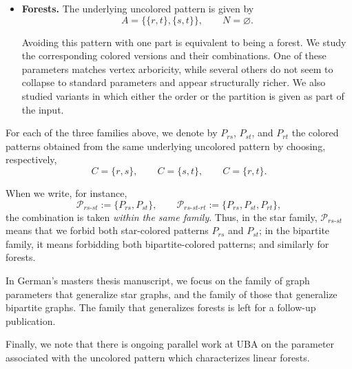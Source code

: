 \documentclass[11pt]{article}
\theoremstyle{definition}
\theoremstyle{plain}
\theoremstyle{remark}
\begin{document}
\begin{itemize}
Overall, in the star and bipartite families, the parameters studied so far collapse to previously known graph
parameters, such as vertex cover or chromatic number, or are equivalent to them.
\medskip


\item \textbf{Forests.}
The underlying uncolored pattern is given by
\[
A=\bigl\{\{r,t\},\{s,t\}\bigr\},
\qquad
N=\varnothing.
\]
\begin{center}
\end{center}
Avoiding this pattern with one part is equivalent to being a forest.
We study the corresponding colored versions and their combinations. One of these parameters matches
vertex arboricity, while several others do not seem to collapse to standard parameters and appear
structurally richer. We also studied variants in which either the order or the partition is given
as part of the input.
\end{itemize}
\medskip



For each of the three families above, we denote by \(P_{rs}\), \(P_{st}\), and \(P_{rt}\)
the colored patterns obtained from the same underlying uncolored pattern by choosing,
respectively,
\[
C=\{r,s\},\qquad C=\{s,t\},\qquad C=\{r,t\}.
\]

When we write, for instance,
\[
\mathcal P_{rs\text{-}st}:=\{P_{rs},P_{st}\},
\qquad
\mathcal P_{rs\text{-}st\text{-}rt}:=\{P_{rs},P_{st},P_{rt}\},
\]
the combination is taken \emph{within the same family}. Thus, in the star family,
\(\mathcal P_{rs\text{-}st}\) means that we forbid both star-colored patterns \(P_{rs}\) and \(P_{st}\);
in the bipartite family, it means forbidding both bipartite-colored patterns; and similarly for forests.
\smallskip

In German's masters thesis manuscript, we focus on the family of graph parameters that generalize star graphs, and the family of those that generalize bipartite graphs. The family that generalizes forests is left for a follow-up publication.

Finally, we note that there is ongoing parallel work at UBA on the parameter associated with the uncolored pattern
which characterizes linear forests.
\end{document}
